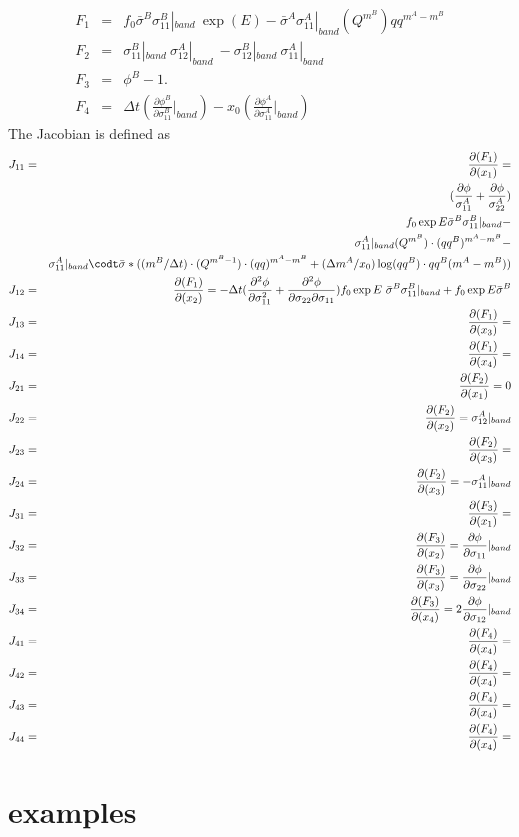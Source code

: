 \documentclass[12pt]{amsart}
\begin{document}
\begin{eqnarray}
  \label{eq:func2_Fi}
  F_1&=&f_0 \bar{\sigma}^B\sigma_{11}^B|_{band}\ \exp(E) - \bar{\sigma}^A \sigma_{11}^A|_{band} (Q^{m^B})qq^{m^A-m^B}\\
  F_2&=&\sigma_{11}^B|_{band}\ \sigma_{12}^A|_{band}\ -\sigma_{12}^B|_{band}\ \sigma_{11}^A|_{band}\nonumber\\
  F_3&=&\phi^B-1.\nonumber \\
  F_4&=&\Delta t (\frac{\partial \phi^B}{\partial\sigma^B_{11}}|_{band}) - x_0 (\frac{\partial \phi^A}{\partial\sigma^A_{11}}|_{band})\nonumber
\end{eqnarray}
The Jacobian is defined as
\begin{eqnarray}
  \label{eq:jacobian_fld2}
  J_{11}&=&\frac{\partial(F_1)}{\partial(x_1)}=\\
       & &(\frac{\partial\phi}{\sigma_{11}^A}+\frac{\partial\phi}{\sigma_{22}^A})\nonumber\\
       & &f_0\exp{E}\bar{\sigma}^B\sigma_{11}^B|_{band}- \nonumber \\
       & &\sigma^A_{11}|_{band}(Q^{m^B})\cdot (qq^B)^{m^A-m^B}-\nonumber \\
       & &\sigma^A_{11}|_{band}\codt\bar{\sigma}*((m^B/\Delta t)\cdot (Q^{m^B-1})\cdot (qq)^{m^A-m^B}+(\Delta m^A/x_0)\log(qq^B)\cdot{qq^B}(m^A-m^B))\nonumber\\
  J_{12}&=&\frac{\partial(F_1)}{\partial(x_2)}=-\Delta{t} (\frac{\partial^2\phi}{\partial\sigma_{11}^2}+\frac{\partial^2\phi}{\partial\sigma_{22}\partial\sigma_{11}})f_0\exp{E}\ \bar{\sigma}^B\sigma^B_{11}|_{band}+f_0\exp{E}\bar{\sigma}^B\nonumber\\
  J_{13}&=&\frac{\partial(F_1)}{\partial(x_3)}=\nonumber\\
  J_{14}&=&\frac{\partial(F_1)}{\partial(x_4)}=\nonumber\\
  J_{21}&=&\frac{\partial(F_2)}{\partial(x_1)}=0\nonumber\\
  J_{22}&=&\frac{\partial(F_2)}{\partial(x_2)}=\sigma_{12}^A|_{band}\nonumber\\
  J_{23}&=&\frac{\partial(F_2)}{\partial(x_3)}=\nonumber\\
  J_{24}&=&\frac{\partial(F_2)}{\partial(x_3)}=-\sigma_{11}^A|_{band}\nonumber\\
  J_{31}&=&\frac{\partial(F_3)}{\partial(x_1)}=\nonumber\\
  J_{32}&=&\frac{\partial(F_3)}{\partial(x_2)}=\frac{\partial\phi}{\partial\sigma_{11}}|_{band}\nonumber\\
  J_{33}&=&\frac{\partial(F_3)}{\partial(x_3)}=\frac{\partial\phi}{\partial\sigma_{22}}|_{band}\nonumber\\
  J_{34}&=&\frac{\partial(F_3)}{\partial(x_4)}=2\frac{\partial\phi}{\partial\sigma_{12}}|_{band}\nonumber\\
  
  J_{41}&=&\frac{\partial(F_4)}{\partial(x_4)}=\nonumber\\
  J_{42}&=&\frac{\partial(F_4)}{\partial(x_4)}=\nonumber\\
  J_{43}&=&\frac{\partial(F_4)}{\partial(x_4)}=\nonumber\\
  J_{44}&=&\frac{\partial(F_4)}{\partial(x_4)}=\nonumber
\end{eqnarray}

\section{examples}
\end{document}
